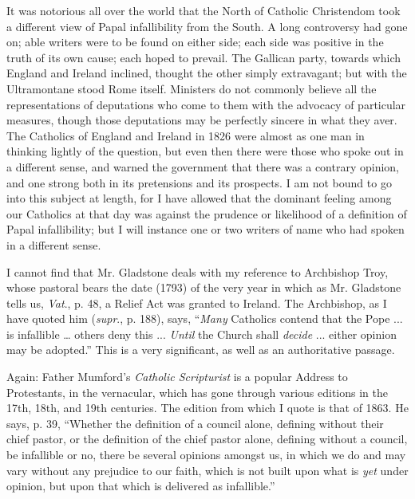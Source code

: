 It was notorious all over the world that the North of Catholic
Christendom took a different view of Papal infallibility from the South.
A long controversy had gone on; able writers were to be found on either
side; each side was positive in the truth of its own cause; each hoped
to prevail. The Gallican party, towards which England and Ireland
inclined, thought the other simply extravagant; but with the
Ultramontane stood Rome itself. Ministers do not commonly believe all
the representations of deputations who come to them with the advocacy of
particular measures, though those deputations may be perfectly sincere
in what they aver. The Catholics of England and Ireland in 1826 were
almost as one man in thinking lightly of the question, but even then
there were those who spoke out in a different sense, and warned the
government that there was a contrary opinion, and one strong both in its
pretensions and its prospects. I am not bound to go into this subject at
length, for I have allowed that the dominant feeling among our Catholics
at that day was against the prudence or likelihood of a definition of
Papal infallibility; but I will instance one or two writers of name who
had spoken in a different sense.

I cannot find that Mr. Gladstone deals with my reference to
Archbishop Troy, whose pastoral bears the date (1793) of the very year
in which as Mr. Gladstone tells us, \emph{Vat}., p. 48, a Relief Act was
granted to Ireland. The Archbishop, as I have quoted him (\emph{supr}.,
p. 188), says, ``\emph{Many} Catholics contend that the Pope ... is
infallible … others deny this ... \emph{Until} the Church shall \emph{decide}
... either opinion may be adopted.'' This is a very
significant, as well as an authoritative passage.

Again: Father Mumford's \emph{Catholic Scripturist} is a popular
Address to Protestants, in the vernacular, which has gone through
various editions in the 17th, 18th, and 19th centuries. The edition from
which I quote is that of 1863. He says, p. 39, ``Whether the
definition of a council alone, defining without their chief pastor, or
the definition of the chief pastor alone, defining without a council, be
infallible or no, there be several opinions amongst us, in which we do
and may vary without any prejudice to our faith, which is not built upon
what is \emph{yet} under opinion, but upon that which is delivered as
infallible.''

